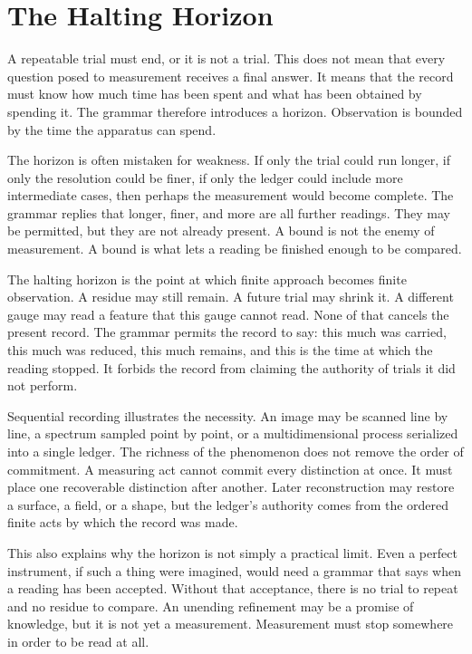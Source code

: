 \section{The Halting Horizon}

A repeatable trial must end, or it is not a trial. This does not mean
that every question posed to measurement receives a final answer. It
means that the record must know how much time has been spent and what
has been obtained by spending it. The grammar therefore introduces a
horizon. Observation is bounded by the time the apparatus can spend.

The horizon is often mistaken for weakness. If only the trial could run
longer, if only the resolution could be finer, if only the ledger could
include more intermediate cases, then perhaps the measurement would
become complete. The grammar replies that longer, finer, and more are
all further readings. They may be permitted, but they are not already
present. A bound is not the enemy of measurement. A bound is what lets a
reading be finished enough to be compared.

The halting horizon is the point at which finite approach becomes
finite observation. A residue may still remain. A future trial may shrink
it. A different gauge may read a feature that this gauge cannot read.
None of that cancels the present record. The grammar permits the record
to say: this much was carried, this much was reduced, this much remains,
and this is the time at which the reading stopped. It forbids the record
from claiming the authority of trials it did not perform.

Sequential recording illustrates the necessity. An image may be scanned
line by line, a spectrum sampled point by point, or a multidimensional
process serialized into a single ledger. The richness of the phenomenon
does not remove the order of commitment. A measuring act cannot commit
every distinction at once. It must place one recoverable distinction
after another. Later reconstruction may restore a surface, a field, or a
shape, but the ledger's authority comes from the ordered finite acts by
which the record was made.

This also explains why the horizon is not simply a practical limit. Even
a perfect instrument, if such a thing were imagined, would need a
grammar that says when a reading has been accepted. Without that
acceptance, there is no trial to repeat and no residue to compare. An
unending refinement may be a promise of knowledge, but it is not yet a
measurement. Measurement must stop somewhere in order to be read at all.

